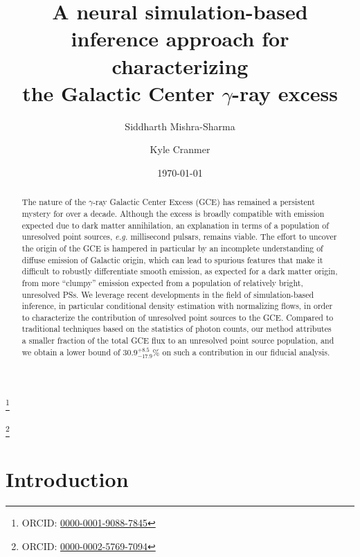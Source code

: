 \documentclass[prd,aps,10pt,nofootinbib,twocolumn,superscriptaddress,preprintnumbers,balancelastpage,longbibliography]{revtex4-1}
\begin{document}
\title{A neural simulation-based inference approach for characterizing \\ the Galactic Center $\gamma$-ray excess}

\author{Siddharth Mishra-Sharma}
\thanks{ORCID: \href{https://orcid.org/0000-0001-9088-7845}{0000-0001-9088-7845}}

\author{Kyle Cranmer}
\thanks{ORCID: \href{https://orcid.org/0000-0002-5769-7094}{0000-0002-5769-7094}}

\date{\today}

\begin{abstract}
The nature of the \Fermi $\gamma$-ray Galactic Center Excess (GCE) has remained a persistent mystery for over a decade. Although the excess is broadly compatible with emission expected due to dark matter annihilation, an explanation in terms of a population of unresolved point sources, \emph{e.g.} millisecond pulsars, remains viable. The effort to uncover the origin of the GCE is hampered in particular by an incomplete understanding of diffuse emission of Galactic origin, which can lead to spurious features that make it difficult to robustly differentiate smooth emission, as expected for a dark matter origin, from more ``clumpy'' emission expected from a population of relatively bright, unresolved PSs. We leverage recent developments in the field of simulation-based inference, in particular conditional density estimation with normalizing flows, in order to characterize the contribution of unresolved point sources to the GCE. Compared to traditional techniques based on the statistics of photon counts, our method attributes a smaller fraction of the total GCE flux to an unresolved point source population, and we obtain a lower bound of $30.9^{+8.5}_{-17.9}\%$ on such a contribution in our fiducial analysis.
\end{abstract}

\maketitle

\section{Introduction}
\label{sec:intro}
\end{document}
